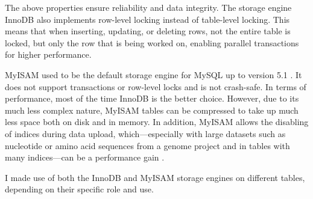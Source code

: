 The above properties ensure reliability and data integrity. The storage engine
InnoDB also implements row-level locking instead of table-level locking. This
means that when inserting, updating, or deleting rows, not the entire table is
locked, but only the row that is being worked on, enabling parallel transactions
for higher performance. 

MyISAM used to be the default storage engine for MySQL up to version 5.1
\citep{schwartz2012}. It does not support transactions or row-level locks and is
not crash-safe. In terms of performance, most of the time InnoDB is the better
choice. However, due to its much less complex nature, MyISAM tables can be
compressed to take up much less space both on disk and in memory. In addition,
MyISAM allows the disabling of indices during data upload, which---especially
with large datasets such as nucleotide or amino acid sequences from a genome
project and in tables with many indices---can be a performance gain
\citep{mysql2013}. 

I made use of both the InnoDB and MyISAM storage engines on different
tables, depending on their specific role and use.

